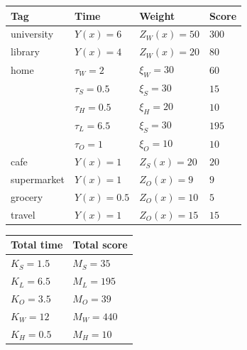 \documentclass[conference]{IEEEtran}
\begin{document}
\begin{table}
\small
{}
\begin{center}
\def\arraystretch{1.7}
\begin{tabular}{| l | l | l | l |}
\hline
\bf Tag & \bf Time & \bf Weight & \bf Score \\
\hline
university & $Y(x)=6$ & $Z_W(x) = 50$ & $300$ \\
\hline
library & $Y(x)=4$ & $Z_W(x) = 20$ & $80$ \\
\hline
home & $\tau_W=2$ & $\xi_W=30$ & $60$ \\
& $\tau_S=0.5$ & $\xi_S=30$ & $15$ \\
& $\tau_H=0.5$ & $\xi_H=20$ & $10$ \\
& $\tau_L=6.5$ & $\xi_S=30$ & $195$ \\
& $\tau_O=1$ & $\xi_O=10$ & $10$ \\
\hline
cafe & $Y(x)=1$ & $Z_S(x)=20$ & $20$ \\
\hline
supermarket & $Y(x)=1$ & $Z_O(x)=9$ & $9$ \\
\hline
grocery & $Y(x)=0.5$ & $Z_O(x)=10$ & $5$ \\
\hline
travel & $Y(x)=1$ & $Z_O(x)=15$ & $15$ \\
\hline
\end{tabular}
\end{center}
\vspace{-1em}
\end{table}
\begin{table}
\small
{}
\begin{center}
\def\arraystretch{1.7}
\begin{tabular}{| l | l |}
\hline
\bf Total time & \bf Total score \\
\hline
$K_S=1.5$ & $M_S=35$ \\
\hline
$K_L=6.5$ & $M_L=195$ \\
\hline
$K_O=3.5$ & $M_O=39$ \\
\hline
$K_W=12$ & $M_W=440$ \\
\hline
$K_H=0.5$ & $M_H=10$ \\
\hline
\end{tabular}
\end{center}
\vspace{-1em}
\end{table}
\end{document}
